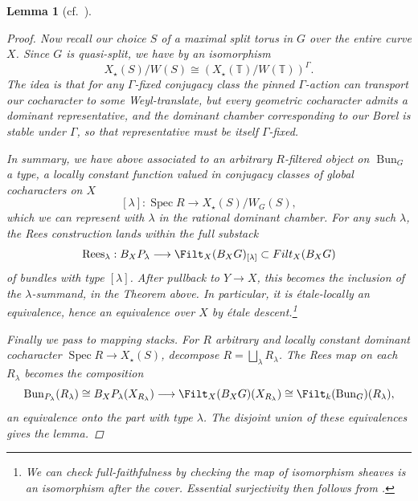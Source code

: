 \documentclass[openany]{amsbook}
\newtheorem{lemma}[theorem]{Lemma}
\theoremstyle{definition}
\theoremstyle{remark}
\numberwithin{equation}{section}
\newcommand{\T}{\mathbb{T}}
\renewcommand{\-}{\operatorname{-}}
\newcommand{\Spec}{\operatorname{Spec}}
\newcommand{\on}[1]{\operatorname{#1}}
\newcommand{\Bun}{\on{Bun}}
\begin{document}
\begin{lemma}[{cf.\ \cite[Prop.\ 1.13, Lemma 3.9]{HeinlothGIT}}]
\begin{proof}
    Now recall our choice $S$ of a maximal split torus in $G$ over the entire curve $X$. Since $G$ is quasi-split, we have by \cite[Lemma 1.1.3]{KottwitzTransfer} an isomorphism
    $$X_\star(S)/W(S) \cong (X_\star(\T)/W(\T))^{\Gamma}.$$ 
    The idea is that for any $\Gamma$-fixed conjugacy class the pinned $\Gamma$-action can transport our cocharacter to some Weyl-translate, but every geometric cocharacter admits a dominant representative, and the dominant chamber corresponding to our Borel is stable under $\Gamma$, so that representative must be itself $\Gamma$-fixed.

    In summary, we have above associated to an arbitrary $R$-filtered object on $\Bun_G$ a \textit{type}, a locally constant function valued in conjugacy classes of global cocharacters on $X$
    $$
        [\lambda] : \Spec R \to X_\star(S)/W_G(S),
    $$
    which we can represent with $\lambda$ in the rational dominant chamber. For any such $\lambda$, the Rees construction lands within the full substack $$\on{Rees}_\lambda : B_X P_\lambda \longrightarrow  \Filt_X(B_X G)_{[\lambda]} \subset Filt_X(B_X G)$$ 
    of bundles with type $[\lambda]$. After pullback to $Y \to X$, this becomes the inclusion of the $\lambda$-summand, in the Theorem above. In particular, it is \'etale-locally an equivalence, hence an equivalence over $X$ by \'etale descent.\footnote{We can check full-faithfulness by checking the map of isomorphism sheaves is an isomorphism after the cover. Essential surjectivity then follows from \cite[Lemma 046N]{stacks-project}.} 

    Finally we pass to mapping stacks. For $R$ arbitrary and locally constant dominant cocharacter $\Spec R \to X_\star(S)$, decompose $R = \bigsqcup_{\lambda} R_\lambda$. The Rees map on each $R_\lambda$ becomes the composition
    $$
        \Bun_{P_\lambda}(R_\lambda) \cong B_X P_\lambda (X_{R_\lambda}) \longrightarrow \Filt_X(B_X G)(X_{R_\lambda}) \cong \Filt_k(\Bun_G)(R_\lambda),
    $$
    an equivalence onto the part with type $\lambda$. The disjoint union of these equivalences gives the lemma.
    \end{proof}
\end{lemma} 
\end{document}
